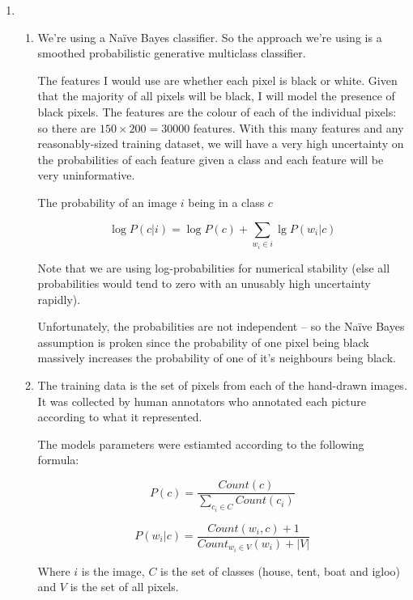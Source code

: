 \documentclass[10pt, a4paper]{article}
\begin{document}
\begin{enumerate}[label=(\alph*)]

\item 

\begin{enumerate}

\item We're using a Na\"ive Bayes classifier. So the 
approach we're using is a smoothed probabilistic generative multiclass classifier.

The features I would use are whether each pixel is black or white. Given that the majority of all 
pixels will be black, I will model the presence of black pixels. The features are the colour of each of 
the individual pixels: so there are $150 \times 200 = 30000$ features. With this many features and any reasonably-sized 
training dataset, we will have a very high uncertainty on the probabilities of each feature given a 
class and each feature will be very uninformative.

The probability of an image $i$ being in a class $c$

\[
\log P(c|i) = \log P(c) + \sum_{w_i \in i} \lg P(w_i|c)
\]

Note that we are using log-probabilities for numerical stability (else all probabilities would tend to zero with an unusably 
high uncertainty rapidly).

Unfortunately, the probabilities are not independent -- so the Na\"ive Bayes assumption is proken since the 
probability of one pixel being black massively increases the probability of one of it's neighbours being black.

\item The training data is the set of pixels from each of the hand-drawn images. It was collected by human annotators who 
annotated each picture according to what it represented. 

The models parameters were estiamted according to the following formula:

\[
P(c) = \frac{\mathit{Count}(c)}{\sum_{c_i \in C}\mathit{Count}(c_i)}
\]

\[
P(w_i|c) = \frac{\mathit{Count}(w_i, c) + 1}{\mathit{Count}_{w_i \in V}(w_i) + |V|}
\]

Where $i$ is the image, $C$ is the set of classes (house, tent, boat and igloo) and 
$V$ is the set of all pixels.

\end{enumerate}


\end{enumerate}
\end{document}
